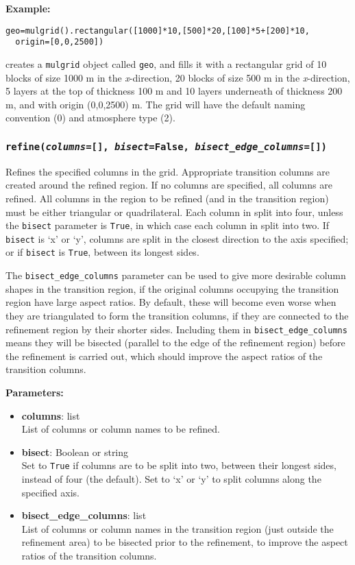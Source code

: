 \textbf{Example:}

\begin{verbatim}
geo=mulgrid().rectangular([1000]*10,[500]*20,[100]*5+[200]*10,
  origin=[0,0,2500])
\end{verbatim}

creates a \texttt{mulgrid} object called \texttt{geo}, and fills it with a rectangular grid of 10 blocks of size 1000 m in the \emph{x}-direction, 20 blocks of size 500 m in the \emph{x}-direction, 5 layers at the top of thickness 100 m and 10 layers underneath of thickness 200 m, and with origin (0,0,2500) m.  The grid will have the default naming convention (0) and atmosphere type (2).

\subsubsection{\texttt{refine(\emph{columns}=[], \emph{bisect}=False, \emph{bisect\_edge\_columns}=[])}}

Refines the specified columns in the grid.  Appropriate transition columns are created around the refined region.  If no columns are specified, all columns are refined.  All columns in the region to be refined (and in the transition region) must be either triangular or quadrilateral.  Each column in split into four, unless the \texttt{bisect} parameter is \texttt{True}, in which case each column in split into two.  If \texttt{bisect} is `x' or `y', columns are split in the closest direction to the axis specified; or if \texttt{bisect} is \texttt{True}, between its longest sides.

The \texttt{bisect\_edge\_columns} parameter can be used to give more desirable column shapes in the transition region, if the original columns occupying the transition region have large aspect ratios.  By default, these will become even worse when they are triangulated to form the transition columns, if they are connected to the refinement region by their shorter sides.  Including them in \texttt{bisect\_edge\_columns} means they will be bisected (parallel to the edge of the refinement region) before the refinement is carried out, which should improve the aspect ratios of the transition columns.

\textbf{Parameters:}
\begin{itemize}
  \item \textbf{columns}: list\\
    List of columns or column names to be refined.
  \item \textbf{bisect}: Boolean or string\\
    Set to \texttt{True} if columns are to be split into two, between their longest sides, instead of four (the default).  Set to `x' or `y' to split columns along the specified axis.
  \item \textbf{bisect\_edge\_columns}: list\\
    List of columns or column names in the transition region (just outside the refinement area) to be bisected prior to the refinement, to improve the aspect ratios of the transition columns.
\end{itemize}


